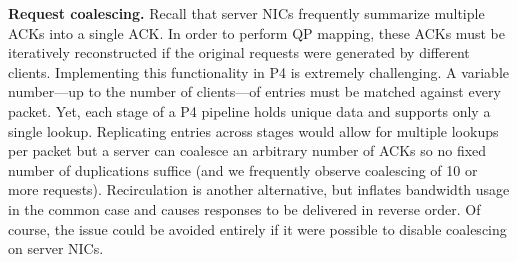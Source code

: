 \textbf{Request coalescing.} Recall that server NICs frequently
summarize multiple ACKs into a single ACK.  In order to perform QP
mapping, these ACKs must be iteratively reconstructed if the
original requests were generated by different clients.
Implementing this functionality in P4 is extremely challenging. A
variable number---up to the number of clients---of entries must be
matched against every packet.  Yet, each stage of a P4 pipeline holds
unique data and supports only a single lookup.
Replicating entries across stages would allow for multiple lookups
per packet but a server can coalesce
an arbitrary number of ACKs so no fixed number of duplications suffice
(and we frequently observe coalescing of 10 or more requests).
Recirculation is another alternative, but inflates bandwidth usage in
the common case and causes responses to be delivered in reverse order.
Of course, the issue could be avoided entirely if it were possible
to disable coalescing on server NICs.





